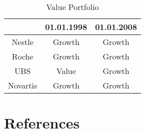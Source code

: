\documentclass{article}
\begin{document}
\begin{table} [!h] \centering 
  \begin{threeparttable}
    \caption{Value Portfolio}
     \begin{tabular}{ccc}
        \toprule

             & 01.01.1998 & 01.01.2008\\ \midrule
Nestle  & Growth & Growth     \\
Roche & Growth & Growth        \\ 
UBS & Value & Growth \\
Novartis & Growth & Growth
\\ \bottomrule







\end{tabular}
\end{threeparttable}
\end{table}

\newpage

\section{References}
\begingroup
\renewcommand{\section}[2]{}

\endgroup

\newpage
\end{document}
